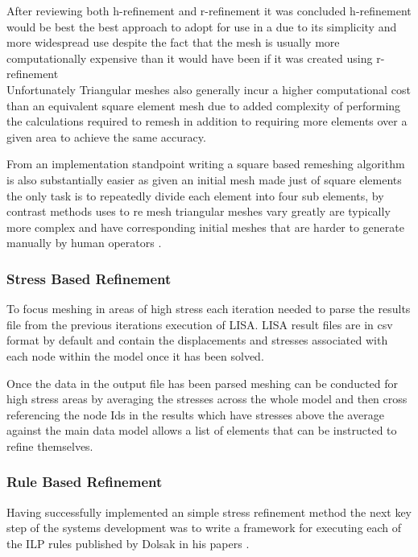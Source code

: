 \documentclass{article}
\begin{document}

After reviewing both h-refinement \cite{HandPRefinements} and r-refinement \cite{RRefinement} it was concluded h-refinement would be best the best approach to adopt for use in a due to its simplicity and more widespread use \cite{HandPRefinements} despite the fact that the mesh is usually more computationally expensive than it would have been if it was created using r-refinement \cite{RRefinement}\\ 

Unfortunately Triangular meshes also generally incur a higher computational cost than an equivalent square element mesh due to added complexity of performing the calculations required to remesh in addition to requiring more elements over a given area to achieve the same accuracy.

From an implementation standpoint writing a square based remeshing algorithm is also substantially easier as given an initial mesh made just of square elements the only task is to repeatedly divide each element into four sub elements, by contrast methods uses to re mesh triangular meshes vary greatly are typically more complex and have corresponding initial meshes that are harder to generate manually by human operators \cite{HandMeshing}.



\subsubsection{Stress Based Refinement}
To focus meshing in areas of high stress each iteration needed to parse the results file from the previous iterations execution of LISA. LISA result files are in csv format by default and contain the displacements and stresses associated with each node within the model once it has been solved.

Once the data in the output file has been parsed meshing can be conducted for high stress areas by averaging the stresses across the whole model and then cross referencing the node Ids in the results which have stresses above the average against the main data model allows a list of elements that can be instructed to refine themselves.


\subsubsection{Rule Based Refinement}
Having successfully implemented an simple stress refinement method the next key step of the systems development was to write a framework for executing each of the ILP rules published by Dolsak in his papers \cite{DolsakPaper91, DolsakPaper94, appOfILPToFEMeshDesign} \cite{ConsultRuleIntelltSystemFE}.
\end{document}
